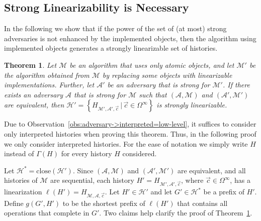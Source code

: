 \documentclass[11pt,letterpaper]{article}
\newtheorem{theorem}{Theorem}[section]
\renewcommand{\AA}{\mathcal{A}}
\newcommand{\HH}{\mathcal{H}}
\newcommand{\MM}{\mathcal{M}}
\newcommand{\vc}{{\vec{c}}}
\newcommand{\close}[1]{\ensuremath{\text{close}\left(#1\right)}}
\begin{document}
\subsection{Strong Linearizability is Necessary}
In the following we show that if the power of the set of (at most) strong adversaries is not enhanced by the implemented objects, then the algorithm using implemented objects generates a strongly linearizable set of histories.
\begin{theorem}\label{thm:prefix-lin-necessary}
Let $\MM$ be an algorithm that uses only atomic objects,
and let $\MM'$ be the algorithm obtained from $\MM$ by replacing some objects with linearizable implementations.
Further, let $\AA'$ be an adversary that is strong for $\MM'$.
If there exists an adversary $\AA$ that is strong for $\MM$ such that $(\AA,\MM)$ and $(\AA',\MM')$ are equivalent,
then $\HH'=\left\{H_{\MM',\AA',\vc}\,|\,\vc\in\Omega^\infty\right\}$ is strongly linearizable.
\end{theorem}


  Due to Observation~\ref{obs:adversary->interpreted=low-level}, it suffices to consider only interpreted histories when proving this theorem.
  Thus, in the following proof we only consider interpreted histories.
  For the ease of notation we simply write $H$ instead of $\Gamma(H)$ for every history $H$ considered.

Let $\HH^\ast=\close{\HH'}$. Since $(\AA,\MM)$ and $(\AA',\MM')$ are equivalent, and all histories of $\MM$ are sequential,
each history $H'=H_{\MM',\AA',\vc}$, where $\vc\in\Omega^\infty$, has a linearization $\ell(H')=H_{\MM,\AA,\vc}$.
Let $H'\in\HH'$ and let $G'\in\HH^\ast$ be a prefix of $H'$.
Define
$g(G',H')$ to be the shortest prefix of $\ell(H')$ that contains all operations that complete in $G'$.
Two claims help clarify the proof of Theorem~\ref{thm:prefix-lin-necessary}.
\end{document}
